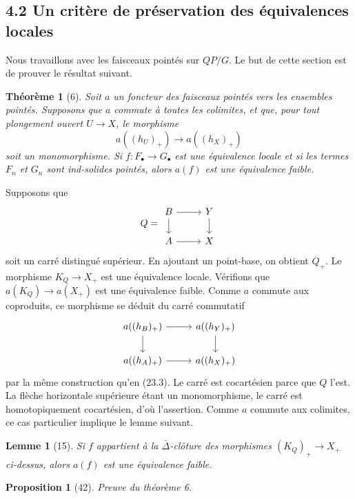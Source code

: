 \documentclass[11pt]{article}
\theoremstyle{deligne}
\newtheorem*{theorem*}{Théorème}
\newtheorem*{proposition*}{Proposition}
\newtheorem*{lemma*}{Lemme}
\begin{document}
\subsection*{4.2 Un critère de préservation des équivalences locales}

Nous travaillons avec les faisceaux pointés sur \(QP/G\). Le but de cette section est de prouver le résultat suivant.

\begin{theorem*}[6]
Soit \(a\) un foncteur des faisceaux pointés vers les ensembles pointés. Supposons que \(a\) commute à toutes les colimites, et que, pour tout plongement ouvert \(U\to X\), le morphisme
\[
a((h_U)_+)\longrightarrow a((h_X)_+)
\]
soit un monomorphisme. Si \(f:F_\bullet\to G_\bullet\) est une équivalence locale et si les termes \(F_n\) et \(G_n\) sont ind-solides pointés, alors \(a(f)\) est une équivalence faible.
\end{theorem*}

Supposons que
\[
Q=\begin{tikzcd}[column sep=2.5em,row sep=1.6em,baseline=(current bounding box.center)]
B \arrow[r] \arrow[d] & Y \arrow[d]\\
A \arrow[r] & X
\end{tikzcd}
\]
soit un carré distingué supérieur. En ajoutant un point-base, on obtient \(Q_+\). Le morphisme \(K_Q\to X_+\) est une équivalence locale. Vérifions que \(a(K_Q)\to a(X_+)\) est une équivalence faible. Comme \(a\) commute aux coproduits, ce morphisme se déduit du carré commutatif
\[
\begin{tikzcd}[column sep=2.6em,row sep=1.8em]
a((h_B)_+) \arrow[r] \arrow[d] & a((h_Y)_+) \arrow[d]\\
a((h_A)_+) \arrow[r] & a((h_X)_+)
\end{tikzcd}
\]
par la même construction qu'en (23.3). Le carré est cocartésien parce que \(Q\) l'est. La flèche horizontale supérieure étant un monomorphisme, le carré est homotopiquement cocartésien, d'où l'assertion. Comme \(a\) commute aux colimites, ce cas particulier implique le lemme suivant.

\begin{lemma*}[15]
Si \(f\) appartient à la \(\bar\Delta\)-clôture des morphismes \((K_Q)_+\to X_+\) ci-dessus, alors \(a(f)\) est une équivalence faible.
\end{lemma*}

\begin{proposition*}[42]
Preuve du théorème 6.
\end{proposition*}
\end{document}

